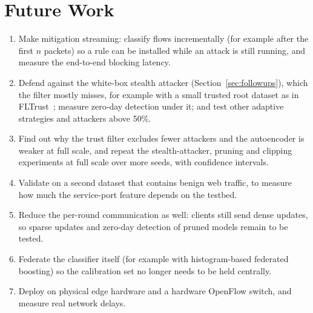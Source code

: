 \section*{Future Work}
\begin{enumerate}
  \item Make mitigation streaming: classify flows incrementally (for example after the first $n$ packets) so a rule can be installed while an attack is still running, and measure the end-to-end blocking latency.
  \item Defend against the white-box stealth attacker (Section~\ref{sec:followups}), which the filter mostly misses, for example with a small trusted root dataset as in FLTrust~\cite{cao2021fltrust}; measure zero-day detection under it; and test other adaptive strategies and attackers above 50\%.
  \item Find out why the trust filter excludes fewer attackers and the autoencoder is weaker at full scale, and repeat the stealth-attacker, pruning and clipping experiments at full scale over more seeds, with confidence intervals.
  \item Validate on a second dataset that contains benign web traffic, to measure how much the service-port feature depends on the testbed.
  \item Reduce the per-round communication as well: clients still send dense updates, so sparse updates and zero-day detection of pruned models remain to be tested.
  \item Federate the classifier itself (for example with histogram-based federated boosting) so the calibration set no longer needs to be held centrally.
  \item Deploy on physical edge hardware and a hardware OpenFlow switch, and measure real network delays.
\end{enumerate}
